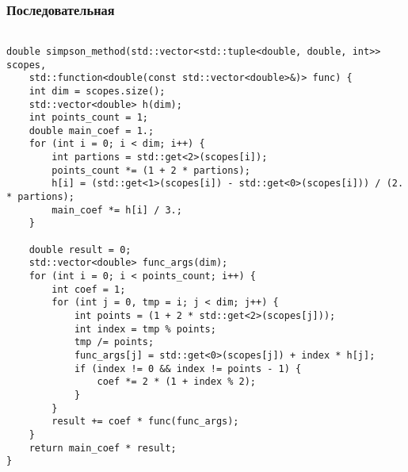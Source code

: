 \documentclass[14pt, a4paper]{extarticle}
\begin{document}
    \subsubsection{Последовательная}
  \begin{lstlisting}

double simpson_method(std::vector<std::tuple<double, double, int>> scopes,
    std::function<double(const std::vector<double>&)> func) {
    int dim = scopes.size();
    std::vector<double> h(dim);
    int points_count = 1;
    double main_coef = 1.;
    for (int i = 0; i < dim; i++) {
        int partions = std::get<2>(scopes[i]);
        points_count *= (1 + 2 * partions);
        h[i] = (std::get<1>(scopes[i]) - std::get<0>(scopes[i])) / (2. * partions);
        main_coef *= h[i] / 3.;
    }

    double result = 0;
    std::vector<double> func_args(dim);
    for (int i = 0; i < points_count; i++) {
        int coef = 1;
        for (int j = 0, tmp = i; j < dim; j++) {
            int points = (1 + 2 * std::get<2>(scopes[j]));
            int index = tmp % points;
            tmp /= points;
            func_args[j] = std::get<0>(scopes[j]) + index * h[j];
            if (index != 0 && index != points - 1) {
                coef *= 2 * (1 + index % 2);
            }
        }
        result += coef * func(func_args);
    }
    return main_coef * result;
}

  \end{lstlisting}
  \newpage
\end{document}
